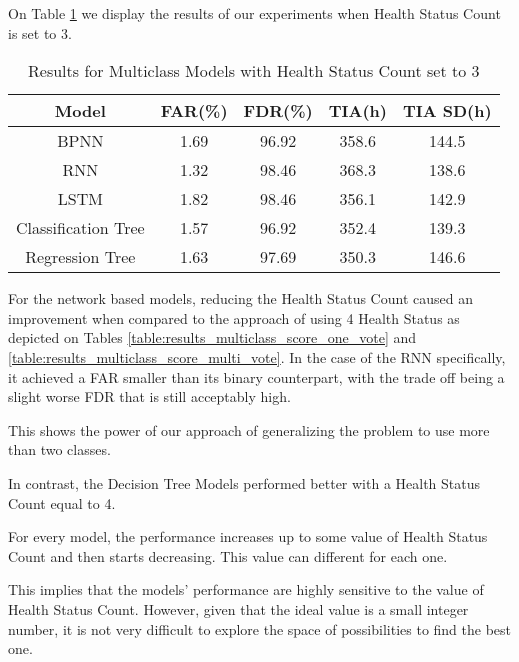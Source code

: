 
On Table \ref{table:results_multiclass_three_health_status} we display the results of our experiments when Health Status Count is set to 3.

\begin{table}
  \begin{center}
    \begin{tabular}{|c|c|c|c|c|}
      \hline
    Model & FAR(\%) & FDR(\%) & TIA(h) & TIA SD(h) \\
    \hline
    BPNN & 1.69 & 96.92 & 358.6 & 144.5 \\
    RNN & 1.32 & 98.46 & 368.3 & 138.6 \\ 
    LSTM & 1.82 & 98.46 & 356.1 & 142.9\\
    Classification Tree & 1.57 & 96.92 & 352.4 & 139.3 \\
    Regression Tree & 1.63 & 97.69 & 350.3 & 146.6 \\
    \hline
    \end{tabular}
    \caption[Results Multiclass Models with Health Status Count set to 3]{Results for Multiclass Models with Health Status Count set to 3}
    \label{table:results_multiclass_three_health_status}
  \end{center}
\end{table}

For the network based models, reducing the Health Status Count caused an improvement when compared to the approach of using 4 Health Status as depicted on Tables \ref{table:results_multiclass_score_one_vote} and \ref{table:results_multiclass_score_multi_vote}.
In the case of the RNN specifically, it achieved a FAR smaller than its binary counterpart, with the trade off being a slight worse FDR that is still acceptably high.

This shows the power of our approach of generalizing the problem to use more than two classes.

In contrast, the Decision Tree Models performed better with a Health Status Count equal to 4.

For every model, the performance increases up to some value of Health Status Count and then starts decreasing.
This value can different for each one.

This implies that the models' performance are highly sensitive to the value of Health Status Count.
However, given that the ideal value is a small integer number, it is not very difficult to explore the space of possibilities to find the best one.